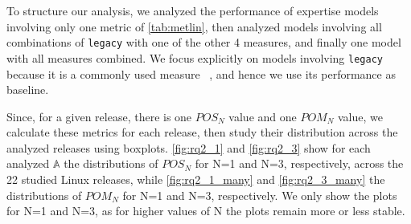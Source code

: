 To structure our analysis, we analyzed the performance of expertise models involving only one metric of \autoref{tab:metlin}, then analyzed models involving all combinations of \texttt{legacy} with one of the other 4 measures, and finally one model with all measures combined. We focus explicitly on models involving \texttt{legacy} because it is a commonly used measure ~\cite{Rahman-2011}, and hence we use its performance as baseline. %

Since, for a given release, there is one $POS_N$ value and one $POM_N$ value, we calculate these metrics for each release, then study their distribution across the analyzed releases using boxplots. %
\autoref{fig:rq2_1} and \autoref{fig:rq2_3} show for each analyzed $\mathbb{A}$ %
the distributions of $POS_N$ for N=1 and N=3, respectively, across the 22 studied Linux releases, while \autoref{fig:rq2_1_many} and \autoref{fig:rq2_3_many} the distributions of $POM_N$ for N=1 and N=3, respectively. %
We only show the plots for N=1 and N=3, as for higher values of N the plots remain more or less stable.




